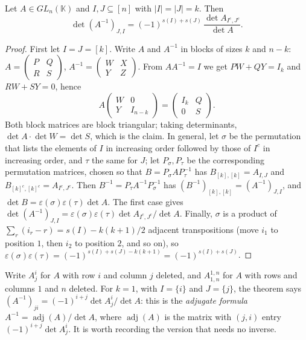\begin{theorem}\label{thm:jacobi}
Let $A\in GL_n(\mathbb K)$ and $I,J\subseteq[n]$ with $|I|=|J|=k$. Then
\[
\det(A^{-1})_{J,I}=(-1)^{s(I)+s(J)}\,\frac{\det A_{I^c,J^c}}{\det A}.
\]
\end{theorem}
\begin{proof}
First let $I=J=[k]$. Write $A$ and $A^{-1}$ in blocks of sizes $k$ and $n-k$:
$A=\begin{pmatrix}P&Q\\R&S\end{pmatrix}$, $A^{-1}=\begin{pmatrix}W&X\\Y&Z\end{pmatrix}$. From $AA^{-1}=I$ we get $PW+QY=I_k$ and
$RW+SY=0$, hence
\[
A\begin{pmatrix}W&0\\Y&I_{n-k}\end{pmatrix}=\begin{pmatrix}I_k&Q\\0&S\end{pmatrix}.
\]
Both block matrices are block triangular; taking determinants, $\det A\cdot\det W=\det S$, which is the claim. In
general, let $\sigma$ be the permutation that lists the elements of $I$ in increasing order followed by those of $I^c$
in increasing order, and $\tau$ the same for $J$; let $P_\sigma,P_\tau$ be the corresponding permutation matrices, chosen
so that $B=P_\sigma AP_\tau^{-1}$ has $B_{[k],[k]}=A_{I,J}$ and $B_{[k]^c,[k]^c}=A_{I^c,J^c}$. Then
$B^{-1}=P_\tau A^{-1}P_\sigma^{-1}$ has $(B^{-1})_{[k],[k]}=(A^{-1})_{J,I}$, and $\det B=\varepsilon(\sigma)\varepsilon(\tau)\det A$. The first
case gives $\det(A^{-1})_{J,I}=\varepsilon(\sigma)\varepsilon(\tau)\det A_{I^c,J^c}/\det A$. Finally, $\sigma$ is a product of
$\sum_r(i_r-r)=s(I)-k(k+1)/2$ adjacent transpositions (move $i_1$ to position $1$, then $i_2$ to position $2$, and so on),
so $\varepsilon(\sigma)\varepsilon(\tau)=(-1)^{s(I)+s(J)-k(k+1)}=(-1)^{s(I)+s(J)}$.
\end{proof}

Write $A^{i}_{j}$ for $A$ with row $i$ and column $j$ deleted, and $A^{1,n}_{1,n}$ for $A$ with rows and columns $1$
and $n$ deleted. For $k=1$, with $I=\{i\}$ and $J=\{j\}$, the theorem says $(A^{-1})_{ji}=(-1)^{i+j}\det A^{i}_{j}/\det A$:
this is the \emph{adjugate formula} $A^{-1}=\operatorname{adj}(A)/\det A$, where $\operatorname{adj}(A)$ is the matrix with
$(j,i)$ entry $(-1)^{i+j}\det A^{i}_{j}$. It is worth recording the version that needs no inverse.

